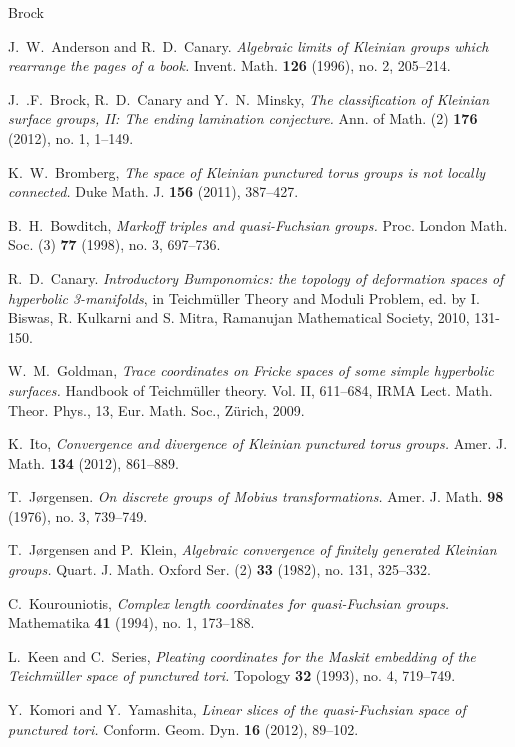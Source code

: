 \documentclass[12pt]{article}
\theoremstyle{plain}
\theoremstyle{definition}
\theoremstyle{remark}
\begin{document}
\begin{thebibliography}{Brock} 

J.~W.~Anderson and  R.~D.~Canary.  
{\it Algebraic limits of Kleinian groups which rearrange the pages of a book.}  
 Invent. Math. {\bf 126} (1996),  no. 2, 205--214. 
 
 J.~.F.~Brock, R.~D.~Canary and Y.~N.~Minsky, 
 {\it The classification of Kleinian surface groups, II: The ending lamination conjecture.} 
  Ann. of Math. (2) {\bf 176} (2012), no. 1, 1--149.

K.~W.~Bromberg, 
{\it The space of Kleinian punctured torus groups is not locally connected.} 
Duke Math. J. {\bf156} (2011), 387--427. 

B.~H.~Bowditch, 
{\it Markoff triples and quasi-Fuchsian groups.}  
Proc. London Math. Soc. (3) {\bf 77} (1998), no. 3, 697--736. 

R.~D.~Canary. 
 {\it Introductory Bumponomics: the topology of deformation spaces of hyperbolic 3-manifolds}, 
 in Teichm\"{u}ller Theory and Moduli Problem, ed. by I. Biswas, R. Kulkarni and S. Mitra, Ramanujan Mathematical Society, 2010, 131-150. 

 W.~M.~Goldman, 
 {\it  Trace coordinates on Fricke spaces of some simple hyperbolic surfaces.} 
 Handbook of Teichm\"uller theory. Vol. II, 611--684, 
IRMA Lect. Math. Theor. Phys., 13, Eur. Math. Soc., Z\"urich, 2009. 


K.~Ito,
{\it Convergence and divergence of Kleinian punctured torus groups.}  
Amer. J. Math. {\bf 134} (2012), 861--889.

T.~J{\o}rgensen. 
{\it On discrete groups of Mobius transformations.} 
 Amer. J. Math. {\bf 98} (1976), no. 3, 739--749. 

 T.~J{\o}rgensen and P.~Klein, 
{\it Algebraic convergence of finitely generated Kleinian groups.}  
Quart. J. Math. Oxford Ser. (2) {\bf 33} (1982), no. 131, 325--332. 

C.~Kourouniotis, 
{\it Complex length coordinates for quasi-Fuchsian groups.}
 Mathematika {\bf 41} (1994), no. 1, 173--188. 


L.~Keen and C.~Series, 
{\it Pleating coordinates for the Maskit embedding of the Teichm\"{u}ller space of punctured tori.}  
Topology {\bf 32} (1993), no. 4, 719--749. 

Y.~Komori and Y.~Yamashita,
{\it Linear slices of the quasi-Fuchsian space of punctured tori.}  
Conform. Geom. Dyn. {\bf 16} (2012), 89--102. 



\end{thebibliography}
\end{document}
